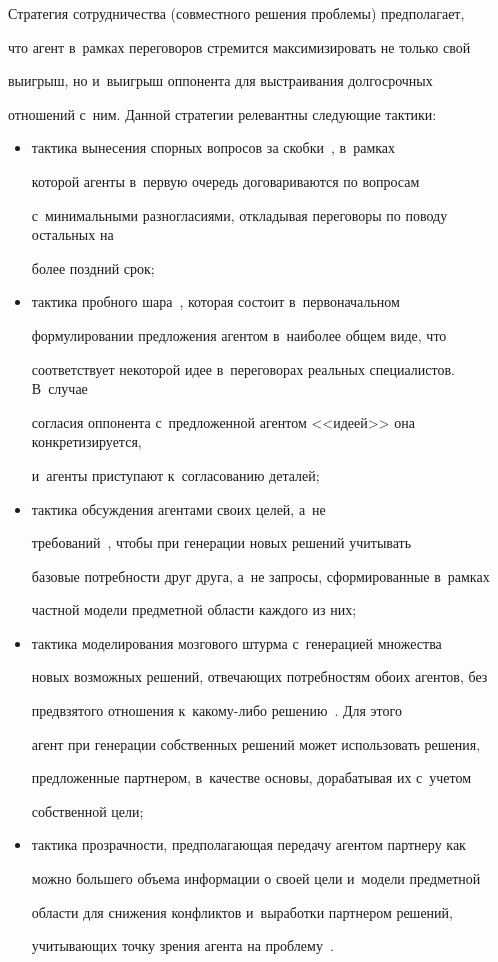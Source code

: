   


  Стратегия сотрудничества (совместного решения проблемы) предполагает, 


что агент в~рамках переговоров стремится максимизировать не только свой 


выигрыш, но и~выигрыш оппонента для выстраивания долгосрочных 


отношений с~ним. Данной стратегии релевантны следующие тактики:


  \begin{itemize}


\item  тактика вынесения спорных вопросов за скобки~\cite{13-lis}, в~рамках 


которой агенты в~первую очередь договариваются по вопросам 


с~минимальными разногласиями, откладывая переговоры по поводу остальных на 


более поздний срок; 


  \item тактика пробного шара~\cite{13-lis}, которая состоит в~первоначальном 


формулировании предложения агентом в~наиболее общем виде, что 


соответствует некоторой идее в~переговорах реальных специалистов. В~случае 


согласия оппонента с~предложенной агентом <<идеей>> она конкретизируется, 


и~агенты приступают к~согласованию деталей;


  \item тактика обсуждения агентами своих целей, а~не  


требований~\cite{14-lis}, чтобы при генерации новых решений учитывать 


базовые потребности друг друга, а~не запросы, сформированные в~рамках 


частной модели предметной области каждого из них;


  \item тактика моделирования мозгового штурма с~генерацией множества 


новых возможных решений, отвечающих потребностям обоих агентов, без 


предвзятого отношения к~ка\-кому-ли\-бо решению~\cite{14-lis}. Для этого 


агент при генерации собственных решений может использовать решения, 


предложенные партнером, в~качестве основы, дорабатывая их с~учетом 


собственной цели;


  \item тактика прозрачности, предполагающая передачу агентом партнеру как 


можно большего объема информации о своей цели и~модели предметной 


области для снижения конфликтов и~выработки партнером решений, 


учитывающих точку зрения агента на проблему~\cite{14-lis}.


  \end{itemize}


